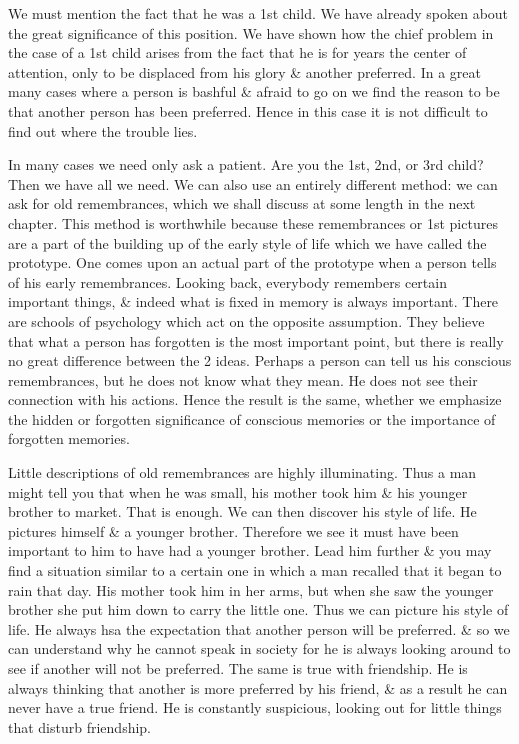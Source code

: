 \documentclass{article}
\numberwithin{equation}{section}
\begin{document}
We must mention the fact that he was a 1st child. We have already spoken about the great significance of this position. We have shown how the chief problem in the case of a 1st child arises from the fact that he is for years the center of attention, only to be displaced from his glory \& another preferred. In a great many cases where a person is bashful \& afraid to go on we find the reason to be that another person has been preferred. Hence in this case it is not difficult to find out where the trouble lies.

In many cases we need only ask a patient. Are you the 1st, 2nd, or 3rd child? Then we have all we need. We can also use an entirely different method: we can ask for old remembrances, which we shall discuss at some length in the next chapter. This method is worthwhile because these remembrances or 1st pictures are a part of the building up of the early style of life which we have called the prototype. One comes upon an actual part of the prototype when a person tells of his early remembrances. Looking back, everybody remembers certain important things, \& indeed what is fixed in memory is always important. There are schools of psychology which act on the opposite assumption. They believe that what a person has forgotten is the most important point, but there is really no great difference between the 2 ideas. Perhaps a person can tell us his conscious remembrances, but he does not know what they mean. He does not see their connection with his actions. Hence the result is the same, whether we emphasize the hidden or forgotten significance of conscious memories or the importance of forgotten memories.

Little descriptions of old remembrances are highly illuminating. Thus a man might tell you that when he was small, his mother took him \& his younger brother to market. That is enough. We can then discover his style of life. He pictures himself \& a younger brother. Therefore we see it must have been important to him to have had a younger brother. Lead him further \& you may find a situation similar to a certain one in which a man recalled that it began to rain that day. His mother took him in her arms, but when she saw the younger brother she put him down to carry the little one. Thus we can picture his style of life. He always hsa the expectation that another person will be preferred. \& so we can understand why he cannot speak in society for he is always looking around to see if another will not be preferred. The same is true with friendship. He is always thinking that another is more preferred by his friend, \& as a result he can never have a true friend. He is constantly suspicious, looking out for little things that disturb friendship.
\end{document}
